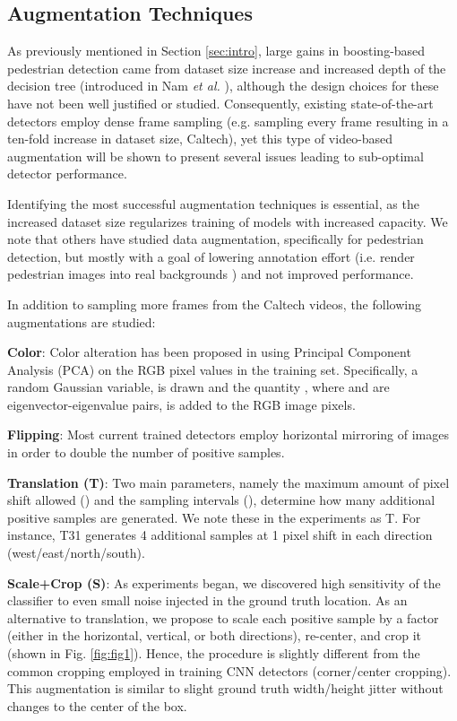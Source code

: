 \documentclass[a4paper,conference]{IEEEtran_icpr}
\begin{document}
\subsection{Augmentation Techniques}
\label{subsec:augment}

As previously mentioned in Section \ref{sec:intro}, large gains in boosting-based pedestrian detection came from dataset size increase and increased depth of the decision tree (introduced in Nam \textit{et al.} \cite{ldcf}), although the design choices for these have not been well justified or studied. Consequently, existing state-of-the-art detectors employ dense frame sampling (e.g. sampling every  frame resulting in a ten-fold increase in dataset size, Caltech), yet this type of video-based augmentation will be shown to present several issues leading to sub-optimal detector performance. 



Identifying the most successful augmentation techniques is essential, as the increased dataset size regularizes training of models with increased capacity. We note that others have studied data augmentation, specifically for pedestrian detection, but mostly with a goal of lowering annotation effort (i.e. render pedestrian images into real backgrounds \cite{6977491,vazquez2012unsupervised}) and not improved performance.



In addition to sampling more frames from the Caltech videos, the following augmentations are studied:

\textbf{Color}: Color alteration has been proposed in \cite{imagenet} using Principal Component Analysis (PCA) on the RGB pixel values in the training set. Specifically, a random Gaussian variable,  is drawn and the quantity , where  and  are eigenvector-eigenvalue pairs, is added to the RGB image pixels.  

\textbf{Flipping}: Most current trained detectors employ horizontal mirroring of images in order to double the number of positive samples.  



\textbf{Translation (T)}: Two main parameters, namely the maximum amount of pixel shift allowed () and the sampling intervals (), determine how many additional positive samples are generated. We note these in the experiments as T. For instance, T31 generates 4 additional samples at 1 pixel shift in each direction (west/east/north/south). 

\textbf{Scale+Crop (S)}: As experiments began, we discovered high sensitivity of the classifier to even small noise injected in the ground truth location. As an alternative to translation, we propose to scale each positive sample by a factor (either in the horizontal, vertical, or both directions), re-center, and crop it (shown in Fig. \ref{fig:fig1}). Hence, the procedure is slightly different from the common cropping employed in training CNN detectors (corner/center cropping). This augmentation is similar to slight ground truth width/height jitter without changes to the center of the box.
\end{document}
